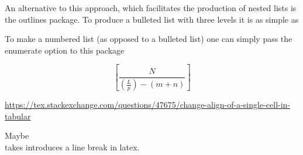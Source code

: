 An alternative to this approach, which facilitates the production of nested lists is the outlines package. To produce a bulleted list with three levels it is as simple as
% 
% 

To make a numbered list (as opposed to a bulleted list) one can simply pass the enumerate option to this package
% 
% 


\[ 
 \left[  \frac{ N } { \left( \frac{L}{p} \right)  - (m+n) }  \right]
\]


\url{https://tex.stackexchange.com/questions/47675/change-align-of-a-single-cell-in-tabular}

Maybe \\ takes introduces a line break in latex.